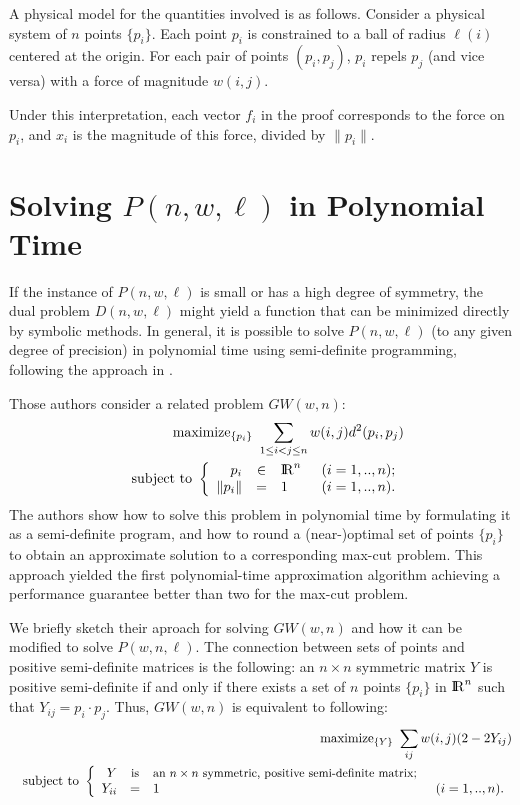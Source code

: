 \documentclass[11pt]{article}
\makeatletter
\newcommand\real{{\rm I\kern-0.2em\rm R}}
\newenvironment{opt}[2]{
\samepage
\renewcommand{\arraystretch}{1.3}
\begin{eqnarray*}
& & \mbox{#1\ } #2 \\
& & \mbox{subject to\ }\left\{ \begin{array}{rcl@{\hspace{0.2in}}l}}{
\end{array}\right.
\end{eqnarray*}
}
\newcommand{\mathfn}[1]{\mathop{\rm #1}\nolimits }
\newcommand{\maximize}{\mathfn{maximize}}
\makeatother
\begin{document}
A physical model for the quantities involved is as follows.
Consider a physical system of $n$ points $\{p_i\}$.
Each point $p_i$ is constrained to a ball of radius $\ell(i)$ 
centered at the origin.
For each pair of points $(p_i,p_j)$,
$p_i$ repels $p_j$ (and vice versa) with a force of magnitude $w(i,j)$.

Under this interpretation, 
each vector $f_i$ in the proof corresponds to the force on $p_i$,
and $x_i$ is the magnitude of this force, divided by $\|p_i\|$.

\section{Solving $P(n,w,\ell)$ in Polynomial Time}

If the instance of $P(n,w,\ell)$ is small or has a high degree of symmetry,
the dual problem $D(n,w,\ell)$ might yield a function
that can be minimized directly by symbolic methods.
In general, 
it is possible to solve $P(n,w,\ell)$
(to any given degree of precision)
in polynomial time using semi-definite programming,
following the approach in \cite{GoemansW94}.

Those authors consider a related problem $GW(w,n)$:
\begin{opt}{$\maximize_{\{p_i\}}$}{
    \sum_{1 \le i < j \le n} w(i,j)d^2(p_i, p_j)}
  p_i & \in & \real^{n}  & (i=1,..,n);
  \\ \|p_i\| & = & 1     & (i=1,..,n).
\end{opt}
The authors show how to solve this problem in polynomial time
by formulating it as a semi-definite program,
and how to round a (near-)optimal set of points $\{p_i\}$
to obtain an approximate solution to a corresponding max-cut problem.
This approach yielded the first polynomial-time approximation algorithm
achieving a performance guarantee better than two for the max-cut problem.

We briefly sketch their aproach for solving $GW(w,n)$
and how it can be modified to solve $P(w,n,\ell)$.
The connection between sets of points 
and positive semi-definite matrices is the following:
an $n\times n$ symmetric matrix $Y$ is positive semi-definite
if and only if there exists a set of $n$ points $\{p_i\}$ in $\real^n$
such that $Y_{ij} = p_i \cdot p_j$.
Thus, $GW(w,n)$ is equivalent to following:
\begin{opt}{$\maximize_{\{Y\}}$}{
    \sum_{ij} w(i,j)(2-2 Y_{ij})}
  Y & \mbox{\small is} & 
        \mbox{\small an $n\times n$ symmetric, positive semi-definite matrix};
  \\ Y_{ii} & = & 1     & (i=1,..,n).
\end{opt}
\end{document}
